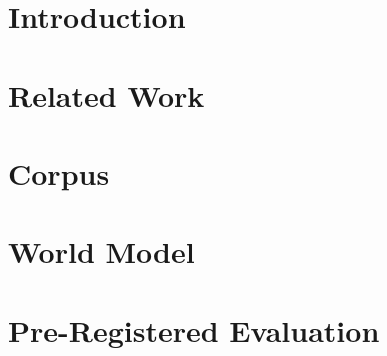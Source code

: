 
\begin{abstract}
TODO: paste from OUTLINE.md \S3 when slots begin to fill.
\end{abstract}

\section{Introduction}

\section{Related Work}

\section{Corpus}

\section{World Model}

\section{Pre-Registered Evaluation}

